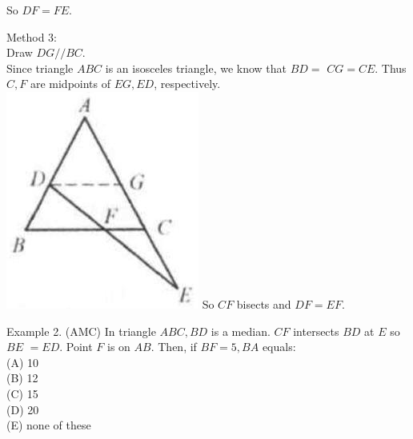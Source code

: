 \documentclass[10pt]{article}
\begin{document}
So \(D F=F E\).

Method 3:\\
Draw \(D G / / B C\).\\
Since triangle \(A B C\) is an isosceles triangle, we know that \(B D=\) \(C G=C E\). Thus \(C, F\) are midpoints of \(E G, E D\), respectively.\\
\includegraphics[max width=\textwidth]{2025_04_17_97bc1f7e44d93c271a88g-102(1)} So \(C F\) bisects and \(D F=E F\).

Example 2. (AMC) In triangle \(A B C, B D\) is a median. \(C F\) intersects \(B D\) at \(E\) so \(B E\) \(=E D\). Point \(F\) is on \(A B\). Then, if \(B F=5, B A\) equals:\\
(A) 10\\
(B) 12\\
(C) 15\\
(D) 20\\
(E) none of these
\end{document}
